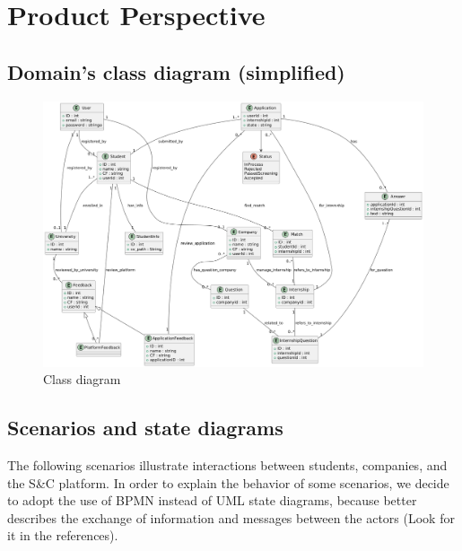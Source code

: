 \section{Product Perspective}
\subsection{Domain's class diagram (simplified)}
\begin{figure}[!ht]
    \centering
    \includegraphics[scale=0.35]{Images/ImagesRASD/class_diagram.png}
    \caption{Class diagram}
\end{figure}

\newpage
\subsection{Scenarios and state diagrams}
The following scenarios illustrate interactions between students, companies, and the S\&C platform.
In order to explain the behavior of some scenarios, we decide to adopt the use of BPMN instead of UML state diagrams, because better describes the exchange of information and messages between the actors (Look for it in the references).


